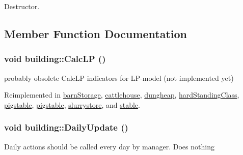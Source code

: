 Destructor. 

\subsection{Member Function Documentation}
\hypertarget{classbuilding_af1f27cbf72295547af61edc9e02a7e61}{
\subsubsection[{CalcLP}]{\setlength{\rightskip}{0pt plus 5cm}void building::CalcLP ()}}
\label{classbuilding_af1f27cbf72295547af61edc9e02a7e61}


probably obsolete CalcLP indicators for LP-\/model (not implemented yet) 

Reimplemented in \hyperlink{classbarn_storage_a5c4a88279dcfa290b08db30d075e1756}{barnStorage}, \hyperlink{classcattlehouse_a7806fd8778ff33751dcb81e06a01471e}{cattlehouse}, \hyperlink{classdungheap_af4b63f00620c98cefc7008b5bc6b2170}{dungheap}, \hyperlink{classhard_standing_class_a03f3703e524d927cbf930e47bebd846d}{hardStandingClass}, \hyperlink{classpigstable_a9e56606838c623a05cb2f6e0b721cc47}{pigstable}, \hyperlink{classpigstable_aff8c1aa84a8727d9a5c6d060bf6fe323}{pigstable}, \hyperlink{classslurrystore_a307b2de3fb81bd7adfa90335f6371816}{slurrystore}, and \hyperlink{classstable_acaf566bef659f0a671e27afa6244df4b}{stable}.\hypertarget{classbuilding_a584ba300427d2a648f478b68065b7a18}{
\subsubsection[{DailyUpdate}]{\setlength{\rightskip}{0pt plus 5cm}void building::DailyUpdate ()}}
\label{classbuilding_a584ba300427d2a648f478b68065b7a18}


Daily actions should be called every day by manager. Does nothing 

